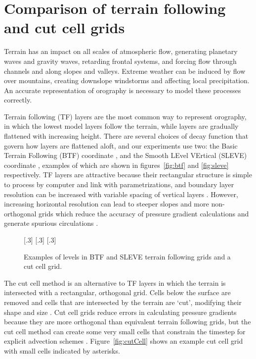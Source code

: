 \documentclass[a4paper]{article}
\begin{document}
\section{Comparison of terrain following and cut cell grids}
Terrain has an impact on all scales of atmospheric flow, generating planetary waves and gravity waves, retarding frontal systems, and forcing flow through channels and along slopes and valleys.  Extreme weather can be induced by flow over mountains, creating downslope windstorms and affecting local precipitation.  An accurate representation of orography is necessary to model these processes correctly.

Terrain following (TF) layers are the most common way to represent orography, in which the lowest model layers follow the terrain, while layers are gradually flattened with increasing height.  There are several choices of decay function that govern how layers are flattened aloft, and our experiments use two: the Basic Terrain Following (BTF) coordinate \citep{galchen-somerville1975}, and the Smooth LEvel VErtical (SLEVE) coordinate \citep{schaer2002}, examples of which are shown in figures~\ref{fig:btf} and \ref{fig:sleve} respectively.  TF layers are attractive because their rectangular structure is simple to process by computer and link with parametrizations, and boundary layer resolution can be increased with variable spacing of vertical layers \citep{schaer2002}.
However, increasing horizontal resolution can lead to steeper slopes and more non-orthogonal grids which reduce the accuracy of pressure gradient calculations and generate spurious circulations \citep{dempsey-davis1998,klemp2011}.

\begin{figure}
	\centering
	[.3\linewidth]{}
	[.3\linewidth]{}
	[.3\linewidth]{}
%
	\caption{Examples of levels in BTF and SLEVE terrain following grids and a cut cell grid.}
	\label{fig:grids}
\end{figure}

The cut cell method is an alternative to TF layers in which the terrain is intersected with a rectangular, orthogonal grid.  Cells below the surface are removed and cells that are intersected by the terrain are `cut', modifying their shape and size \citep{adcroft1997}.  Cut cell grids reduce errors in calculating pressure gradients because they are more orthogonal than equivalent terrain following grids, but the cut cell method can create some very small cells that constrain the timestep for explicit advection schemes \citep{klein2009}.  Figure~\ref{fig:cutCell} shows an example cut cell grid with small cells indicated by asterisks.
\end{document}
